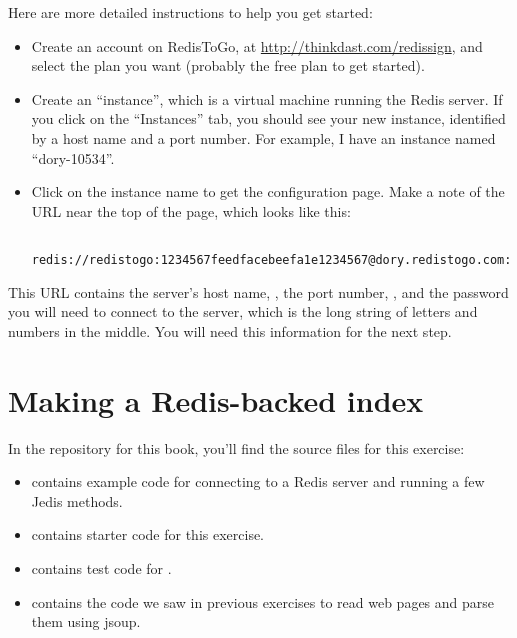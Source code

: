 \documentclass[12pt]{book}
\theoremstyle{exercise}
\begin{document}

Here are more detailed instructions to help you get started:

\begin{itemize}

\item Create an account on RedisToGo, at
  \url{http://thinkdast.com/redissign},
  and select the plan you want (probably the free plan to get started).

\item
  Create an ``instance'', which is a virtual machine running the Redis
  server. If you click on the ``Instances'' tab, you should see your new
  instance, identified by a host name and a port number. For example, I
  have an instance named ``dory-10534''.

\item
  Click on the instance name to get the configuration page. Make a note
  of the URL near the top of the page, which looks like this:

  \begin{verbatim}
  redis://redistogo:1234567feedfacebeefa1e1234567@dory.redistogo.com:10534
  \end{verbatim}

\end{itemize}


This URL contains the server's host name, ,
the port number, , and the password you will need to
connect to the server, which is the long string of letters and numbers
in the middle. You will need this information for the next step.


\section{Making a Redis-backed index}
\label{hello-jedis}


In the repository for this book,
you'll find the source files for this exercise:

\begin{itemize}

\item
   contains example code for connecting to a
  Redis server and running a few Jedis methods.

\item
   contains starter code for this exercise.

\item
   contains test code for
  .

\item
   contains the code we saw in previous exercises to
  read web pages and parse them using jsoup.

\end{itemize}
\end{document}
